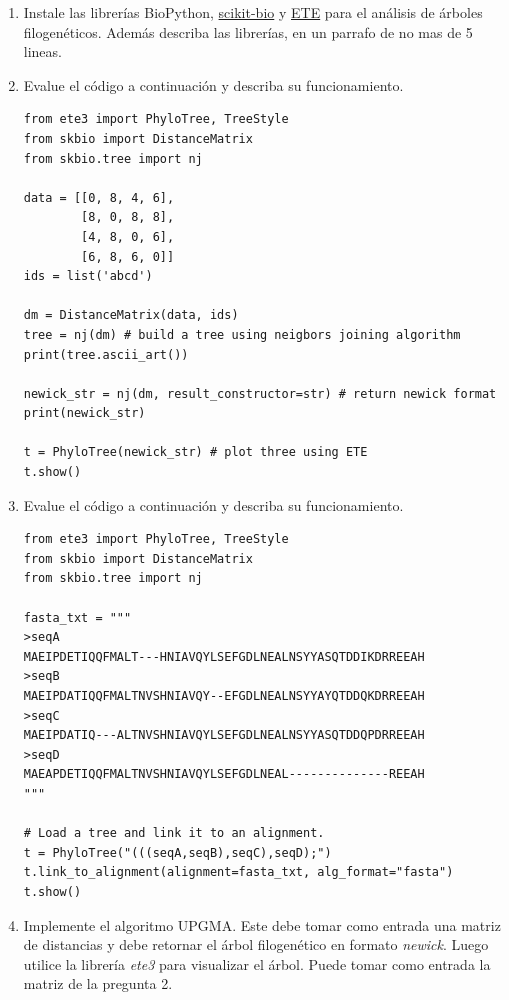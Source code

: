 \documentclass{article}
\begin{document}
	\begin{enumerate}		
		\item Instale las librerías BioPython, \href{http://scikit-bio.org/}{scikit-bio} y \href{http://etetoolkit.org/}{ETE} para el análisis de árboles filogenéticos. Además describa las librerías, en un parrafo de no mas de 5 lineas.
		 
		 \item Evalue el código a continuación y describa su funcionamiento.
		 
		 \begin{lstlisting}[style=python]
from ete3 import PhyloTree, TreeStyle
from skbio import DistanceMatrix
from skbio.tree import nj

data = [[0, 8, 4, 6],
		[8, 0, 8, 8],
		[4, 8, 0, 6],         
		[6, 8, 6, 0]]
ids = list('abcd')

dm = DistanceMatrix(data, ids)
tree = nj(dm) # build a tree using neigbors joining algorithm
print(tree.ascii_art())

newick_str = nj(dm, result_constructor=str) # return newick format
print(newick_str)

t = PhyloTree(newick_str) # plot three using ETE
t.show()
		 \end{lstlisting}	
		 
		 
		\item Evalue el código a continuación y describa su funcionamiento. 
		
		\begin{lstlisting}[style=python]
from ete3 import PhyloTree, TreeStyle
from skbio import DistanceMatrix
from skbio.tree import nj

fasta_txt = """
>seqA
MAEIPDETIQQFMALT---HNIAVQYLSEFGDLNEALNSYYASQTDDIKDRREEAH
>seqB
MAEIPDATIQQFMALTNVSHNIAVQY--EFGDLNEALNSYYAYQTDDQKDRREEAH
>seqC
MAEIPDATIQ---ALTNVSHNIAVQYLSEFGDLNEALNSYYASQTDDQPDRREEAH
>seqD
MAEAPDETIQQFMALTNVSHNIAVQYLSEFGDLNEAL--------------REEAH
"""

# Load a tree and link it to an alignment.
t = PhyloTree("(((seqA,seqB),seqC),seqD);")
t.link_to_alignment(alignment=fasta_txt, alg_format="fasta")
t.show()
		\end{lstlisting}
		
		\item Implemente el algoritmo UPGMA. Este debe tomar como entrada una matriz de distancias y debe retornar el árbol filogenético en formato \textit{newick}. Luego utilice la librería \textit{ete3} para visualizar el árbol. Puede tomar como entrada la matriz de la pregunta 2.
		 
	\end{enumerate}
\end{document}
